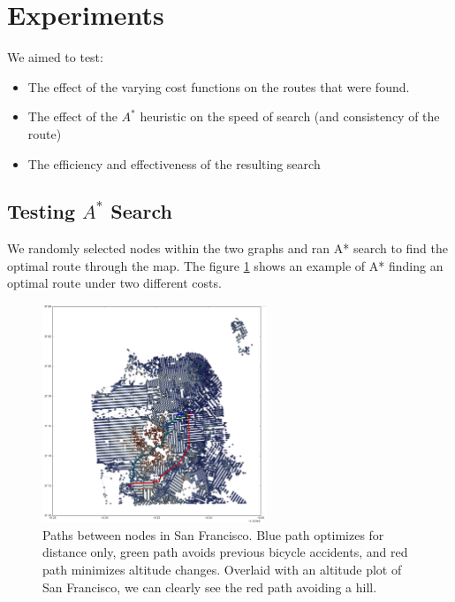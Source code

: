 \documentclass[11pt]{article}
\begin{document}
\section{Experiments}
We aimed to test:
\begin{itemize}
\item The effect of the varying cost functions on the routes that were found.
\item The effect of the $A^{*}$ heuristic on the speed of search (and consistency of the route)
\item The efficiency and effectiveness of the resulting search
\end{itemize}

\subsection{Testing $A^{*}$ Search}
We randomly selected nodes within the two graphs and ran A* search to find the optimal route through the map. The figure \ref{connected_san_fran} shows an example of A* finding an optimal route under two different costs.

\begin{figure}
\label{connected_san_fran}
\center
\caption{Paths between nodes in San Francisco. Blue path optimizes for distance only, green path avoids previous bicycle accidents, and red path minimizes altitude changes. Overlaid with an altitude plot of San Francisco, we can clearly see the red path avoiding a hill.}
\includegraphics[width=0.6\textwidth]{sf_new_plot_2.png}
\end{figure}
\end{document}
